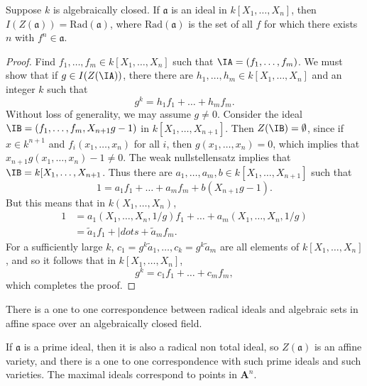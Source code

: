 \begin{theorem}
    Suppose $k$ is algebraically closed. If $\mathfrak{a}$ is an ideal in $k[X_1, \dots, X_n]$, then $I(Z(\mathfrak{a})) = \text{Rad}(\mathfrak{a})$, where $\text{Rad}(\mathfrak{a})$ is the set of all $f$ for which there exists $n$ with $f^n \in \mathfrak{a}$.
\end{theorem}
\begin{proof}
    Find $f_1,\dots,f_m \in k[X_1,\dots,X_n]$ such that $\IA = (f_1,\dots,f_m)$. We must show that if $g \in I(Z(\IA))$, there there are $h_1,\dots,h_m \in k[X_1,\dots,X_n]$ and an integer $k$ such that
    \[ g^k = h_1f_1 + \dots + h_mf_m. \]
    Without loss of generality, we may assume $g \neq 0$. Consider the ideal $\IB = (f_1, \dots, f_m, X_{n+1}g - 1)$ in $k[X_1,\dots,X_{n+1}]$. Then $Z(\IB) = \emptyset$, since if $x \in k^{n+1}$ and $f_i(x_1,\dots,x_n)$ for all $i$, then $g(x_1,\dots,x_n) = 0$, which implies that $x_{n+1}g(x_1,\dots,x_n) - 1 \neq 0$. The weak nullstellensatz implies that $\IB = k[X_1,\dots,X_{n+1}$. Thus there are $a_1,\dots,a_m,b \in k[X_1,\dots,X_{n+1}]$ such that
    \[ 1 = a_1f_1 + \dots + a_mf_m + b (X_{n+1} g - 1). \]
    But this means that in $k(X_1,\dots,X_n)$,
    \begin{align*}
        1 &= a_1(X_1,\dots,X_n,1/g) f_1 + \dots + a_m(X_1,\dots,X_n,1/g)\\
        &= \tilde{a}_1 f_1 + |dots + \tilde{a}_m f_m.
    \end{align*}
    For a sufficiently large $k$, $c_1 = g^k \tilde{a}_1, \dots, c_k = g^k \tilde{a}_m$ are all elements of $k[X_1,\dots,X_n]$, and so it follows that in $k[X_1,\dots,X_n]$,
    \[ g^k = c_1f_1 + \dots + c_mf_m, \]
    which completes the proof.
\end{proof}

\begin{corollary}
    There is a one to one correspondence between radical ideals and algebraic sets in affine space over an algebraically closed field.
\end{corollary}

\begin{corollary}
    If $\mathfrak{a}$ is a prime ideal, then it is also a radical non total ideal, so $Z(\mathfrak{a})$ is an affine variety, and there is a one to one correspondence with such prime ideals and such varieties. The maximal ideals correspond to points in $\mathbf{A}^n$.
\end{corollary}

